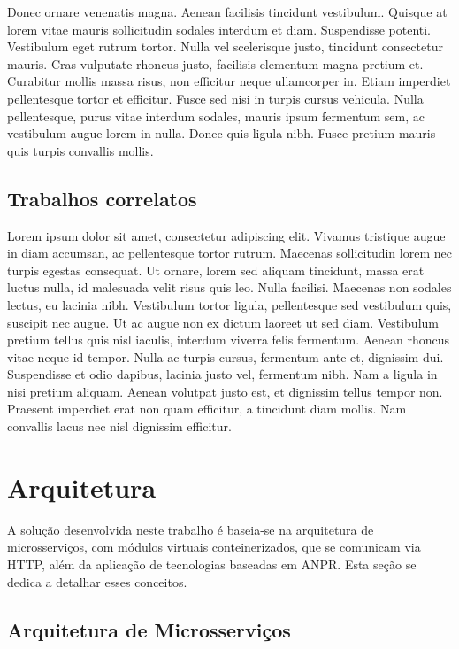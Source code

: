 \documentclass[12pt]{article}
\begin{document}
Donec ornare venenatis magna. Aenean facilisis tincidunt vestibulum. Quisque at lorem vitae mauris sollicitudin sodales interdum et diam. Suspendisse potenti. Vestibulum eget rutrum tortor. Nulla vel scelerisque justo, tincidunt consectetur mauris. Cras vulputate rhoncus justo, facilisis elementum magna pretium et. Curabitur mollis massa risus, non efficitur neque ullamcorper in. Etiam imperdiet pellentesque tortor et efficitur. Fusce sed nisi in turpis cursus vehicula. Nulla pellentesque, purus vitae interdum sodales, mauris ipsum fermentum sem, ac vestibulum augue lorem in nulla. Donec quis ligula nibh. Fusce pretium mauris quis turpis convallis mollis. 

\subsection{Trabalhos correlatos}

Lorem ipsum dolor sit amet, consectetur adipiscing elit. Vivamus tristique augue in diam accumsan, ac pellentesque tortor rutrum. Maecenas sollicitudin lorem nec turpis egestas consequat. Ut ornare, lorem sed aliquam tincidunt, massa erat luctus nulla, id malesuada velit risus quis leo. Nulla facilisi. Maecenas non sodales lectus, eu lacinia nibh. Vestibulum tortor ligula, pellentesque sed vestibulum quis, suscipit nec augue. Ut ac augue non ex dictum laoreet ut sed diam. Vestibulum pretium tellus quis nisl iaculis, interdum viverra felis fermentum. Aenean rhoncus vitae neque id tempor. Nulla ac turpis cursus, fermentum ante et, dignissim dui. Suspendisse et odio dapibus, lacinia justo vel, fermentum nibh. Nam a ligula in nisi pretium aliquam. Aenean volutpat justo est, et dignissim tellus tempor non. Praesent imperdiet erat non quam efficitur, a tincidunt diam mollis. Nam convallis lacus nec nisl dignissim efficitur. 


\section{Arquitetura} \label{sec:architecture}

A solução desenvolvida neste trabalho é baseia-se na arquitetura de microsserviços, com módulos virtuais conteinerizados, que se comunicam via HTTP, além da aplicação de tecnologias baseadas em ANPR. Esta seção se dedica a detalhar esses conceitos.

\subsection{Arquitetura de Microsserviços}
\end{document}

